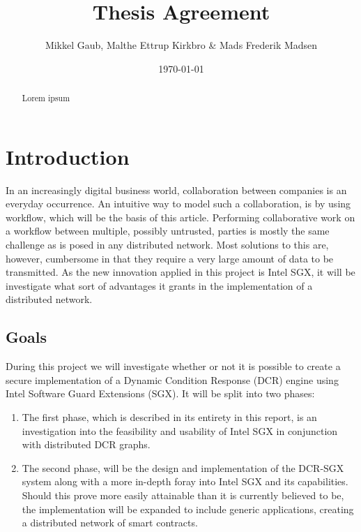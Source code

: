 \documentclass{article}
\author{Mikkel Gaub, Malthe Ettrup Kirkbro \& Mads Frederik Madsen}
\title{Thesis Agreement}
\date{\today}
\begin{document}
\maketitle
\thispagestyle{empty}

\vspace{\fill}

\begin{abstract}
Lorem ipsum
\end{abstract}

\pagebreak

\tableofcontents

\pagebreak

	\section{Introduction}

	In an increasingly digital business world, collaboration between companies is an everyday occurrence.
	An intuitive way to model such a collaboration, is by using workflow, which will be the basis of this article.
	Performing collaborative work on a workflow between multiple, possibly untrusted, parties is mostly the same challenge as is posed in any distributed network. 
	Most solutions to this are, however, cumbersome in that they require a very large amount of data to be transmitted.
	As the new innovation applied in this project is Intel SGX, it will be investigate what sort of advantages it grants in the implementation of a distributed network.

		\subsection{Goals}

		During this project we will investigate whether or not it is possible to create a secure implementation of a Dynamic Condition Response\cite{dcr-paper} (DCR) engine using Intel Software Guard Extensions\cite{intel-sgx-explained} (SGX).
		It will be split into two phases:
		\begin{enumerate}
			\item The first phase, which is described in its entirety in this report, is an investigation into the feasibility and usability of Intel SGX in conjunction with distributed DCR graphs.
			\item The second phase, will be the design and implementation of the DCR-SGX system along with a more in-depth foray into Intel SGX and its capabilities. Should this prove more easily attainable than it is currently believed to be, the implementation will be expanded to include generic applications, creating a distributed network of smart contracts\cite{smart-contracts}.
		\end{enumerate}
\end{document}
